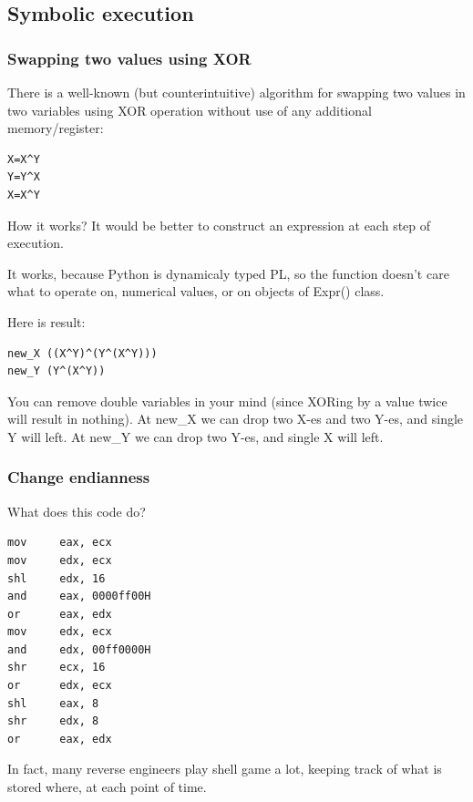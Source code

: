 \subsection{Symbolic execution}
\label{symbolic_exec}

\subsubsection{Swapping two values using XOR}

There is a well-known (but counterintuitive) algorithm for swapping two values in two variables
using XOR operation without use of any additional memory/register:

\begin{lstlisting}
X=X^Y
Y=Y^X
X=X^Y
\end{lstlisting}

How it works?
It would be better to construct an expression at each step of execution.



It works, because Python is dynamicaly typed \ac{PL}, so the function doesn't care what to operate on,
numerical values, or on objects of Expr() class.

Here is result:

\begin{lstlisting}
new_X ((X^Y)^(Y^(X^Y)))
new_Y (Y^(X^Y))
\end{lstlisting}

You can remove double variables in your mind (since XORing by a value twice will result in nothing).
At new\_X we can drop two X-es and two Y-es, and single Y will left.
At new\_Y we can drop two Y-es, and single X will left.

\subsubsection{Change endianness}

What does this code do?

\begin{lstlisting}
mov     eax, ecx
mov     edx, ecx
shl     edx, 16
and     eax, 0000ff00H
or      eax, edx
mov     edx, ecx
and     edx, 00ff0000H
shr     ecx, 16
or      edx, ecx
shl     eax, 8
shr     edx, 8
or      eax, edx
\end{lstlisting}

In fact, many reverse engineers play shell game a lot, keeping track of what is stored where, at each point of time.

